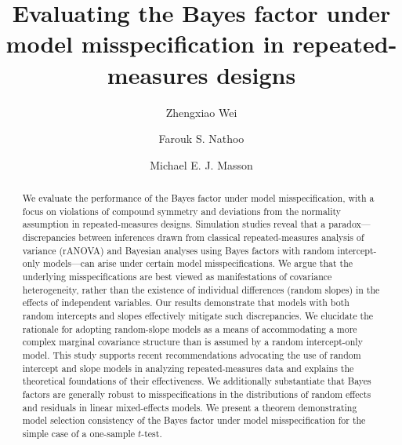 \documentclass[preprint,12pt,authoryear]{elsarticle}
\begin{document}
\begin{frontmatter}

\title{Evaluating the Bayes factor under model misspecification in repeated-measures designs} %

\author[label1]{Zhengxiao Wei} %

\author[label1]{Farouk S. Nathoo}

\author[label2]{Michael E. J. Masson}



\begin{abstract}
We evaluate the performance of the Bayes factor under model misspecification, with a focus on violations of compound symmetry and deviations from the normality assumption in repeated-measures designs. Simulation studies reveal that a paradox—discrepancies between inferences drawn from classical repeated-measures analysis of variance (rANOVA) and Bayesian analyses using Bayes factors with random intercept-only models—can arise under certain model misspecifications. We argue that the underlying misspecifications are best viewed as manifestations of covariance heterogeneity, rather than the existence of individual differences (random slopes) in the effects of independent variables. Our results demonstrate that models with both random intercepts and slopes effectively mitigate such discrepancies. We elucidate the rationale for adopting random-slope models as a means of accommodating a more complex marginal covariance structure than is assumed by a random intercept-only model. This study supports recent recommendations advocating the use of random intercept and slope models in analyzing repeated-measures data and explains the theoretical foundations of their effectiveness. We additionally substantiate that Bayes factors are generally robust to misspecifications in the distributions of random effects and residuals in linear mixed-effects models. We present a theorem demonstrating model selection consistency of the Bayes factor under model misspecification for the simple case of a one-sample $t$-test.
\end{abstract}


\end{frontmatter}
\end{document}
